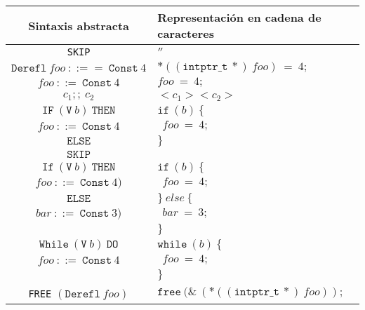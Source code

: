 \begin{table}[h!]
\centering
\begin{tabular}{|c|l|}
  \hline
  \textbf{Sintaxis abstracta} & \textbf{Representación en cadena de caracteres} \\ [0.5ex]
  \hline \hline
  \verb|SKIP| & $''$ \\
  \hline
  $\mathtt{Derefl}\ foo\ ::==\ \mathtt{Const}\ 4$                            & $*((\mathtt{intptr\_t}\ *)\ foo)\ =\ 4;$ \\
  \hline
  $foo\ ::=\ \mathtt{Const}\ 4$                                              & $foo\ =\ 4;$ \\
  \hline
  $c_1;;\ c_2$                                                               & $<c_1> <c_2>$ \\
  \hline
  $\mathtt{IF}\ (\mathtt{V}\ b)\ \mathtt{THEN}$                              & $\mathtt{if}\ (b)\ \{$\\
  $foo\ ::=\ \mathtt{Const}\ 4$                                              & $\ \ foo\ =\ 4;$ \\
  $\mathtt{ELSE}$                                                            &  $\}$ \\
  $\mathtt{SKIP}$                                                            & \\
  \hline
  $\mathtt{If}\ (\mathtt{V}\ b)\ \mathtt{THEN}$                              & $\mathtt{if}\ (b)\ \{$\\
  $foo\ ::=\ \mathtt{Const}\ 4)$                                             & $\ \ foo\ =\ 4;$ \\
  $\mathtt{ELSE}$                                                            & $\}\ else\ \{$ \\
  $bar\ ::=\ \mathtt{Const}\ 3)$                                             & $\ \ bar\ =\ 3;$ \\
                                                                             & $\}$ \\
  \hline
  $\mathtt{While}\ (\mathtt{V}\ b)\ \mathtt{DO}$                             & $\mathtt{while}\ (b)\ \{$\\
  $foo\ ::=\ \mathtt{Const}\ 4$                                              & $\ \ foo\ =\ 4;$ \\
                                                                             & $\}$ \\
  \hline
  \verb|FREE| $(\mathtt{Derefl}\ foo)$                                       & $\mathtt{free}\ (\&\ (*((\mathtt{intptr\_t}\ *)\ foo));$ \\

\end{tabular}
\end{table}
